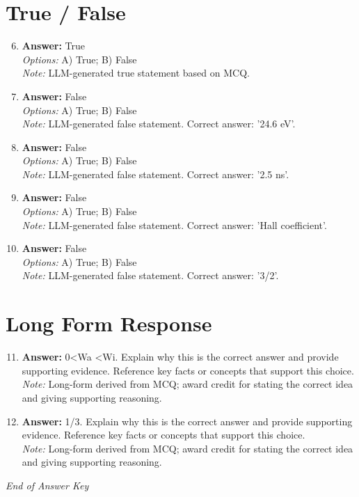 \documentclass[12pt]{article}
\begin{document}
\section*{True / False}
\begin{enumerate}[label=\arabic*.]
\setcounter{enumi}{5}
\item \textbf{Answer:} True
\\ \textit{Options:} A) True; B) False
\\ \textit{Note:} LLM-generated true statement based on MCQ.
\item \textbf{Answer:} False
\\ \textit{Options:} A) True; B) False
\\ \textit{Note:} LLM-generated false statement. Correct answer: '24.6 eV'.
\item \textbf{Answer:} False
\\ \textit{Options:} A) True; B) False
\\ \textit{Note:} LLM-generated false statement. Correct answer: '2.5 ns'.
\item \textbf{Answer:} False
\\ \textit{Options:} A) True; B) False
\\ \textit{Note:} LLM-generated false statement. Correct answer: 'Hall coefficient'.
\item \textbf{Answer:} False
\\ \textit{Options:} A) True; B) False
\\ \textit{Note:} LLM-generated false statement. Correct answer: '3/2'.
\end{enumerate}

\section*{Long Form Response}
\begin{enumerate}[label=\arabic*.]
\setcounter{enumi}{10}
\item \textbf{Answer:} 0\textless{}Wa \textless{}Wi. Explain why this is the correct answer and provide supporting evidence. Reference key facts or concepts that support this choice.
\\ \textit{Note:} Long-form derived from MCQ; award credit for stating the correct idea and giving supporting reasoning.
\item \textbf{Answer:} 1/3. Explain why this is the correct answer and provide supporting evidence. Reference key facts or concepts that support this choice.
\\ \textit{Note:} Long-form derived from MCQ; award credit for stating the correct idea and giving supporting reasoning.
\end{enumerate}

\vfill
\noindent\textit{End of Answer Key}
\end{document}

